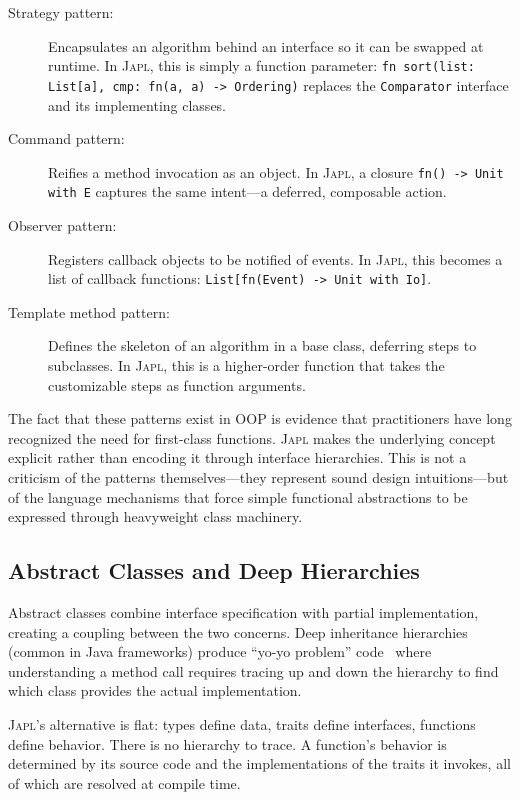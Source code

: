 \documentclass[11pt,a4paper]{article}
\newcommand{\japl}{\textsc{Japl}}
\begin{document}
\begin{description}
  \item[Strategy pattern:] Encapsulates an algorithm behind an interface so it can be swapped at runtime. In \japl{}, this is simply a function parameter: \texttt{fn sort(list: List[a], cmp: fn(a, a) -> Ordering)} replaces the \texttt{Comparator} interface and its implementing classes.
  \item[Command pattern:] Reifies a method invocation as an object. In \japl{}, a closure \texttt{fn() -> Unit with E} captures the same intent---a deferred, composable action.
  \item[Observer pattern:] Registers callback objects to be notified of events. In \japl{}, this becomes a list of callback functions: \texttt{List[fn(Event) -> Unit with Io]}.
  \item[Template method pattern:] Defines the skeleton of an algorithm in a base class, deferring steps to subclasses. In \japl{}, this is a higher-order function that takes the customizable steps as function arguments.
\end{description}

The fact that these patterns exist in OOP is evidence that practitioners have long recognized the need for first-class functions. \japl{} makes the underlying concept explicit rather than encoding it through interface hierarchies. This is not a criticism of the patterns themselves---they represent sound design intuitions---but of the language mechanisms that force simple functional abstractions to be expressed through heavyweight class machinery.

\subsection{Abstract Classes and Deep Hierarchies}

Abstract classes combine interface specification with partial implementation, creating a coupling between the two concerns. Deep inheritance hierarchies (common in Java frameworks) produce ``yo-yo problem'' code~\citep{taenzer1989problems} where understanding a method call requires tracing up and down the hierarchy to find which class provides the actual implementation.

\japl{}'s alternative is flat: types define data, traits define interfaces, functions define behavior. There is no hierarchy to trace. A function's behavior is determined by its source code and the implementations of the traits it invokes, all of which are resolved at compile time.
\end{document}
